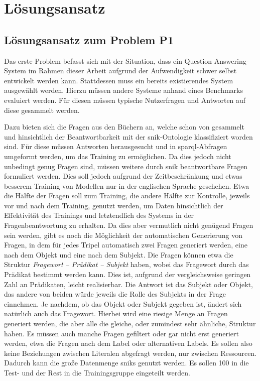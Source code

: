\chapter{Lösungsansatz}\label{ch:approach}

\section{Lösungsansatz zum Problem P1}

Das erste Problem befasst sich mit der Situation, dass ein Question Answering-System im Rahmen dieser Arbeit aufgrund der Aufwendigkeit schwer selbst entwickelt werden kann.
Stattdessen muss ein bereits existierendes System ausgewählt werden.
Hierzu müssen andere Systeme anhand eines Benchmarks evaluiert werden.
Für diesen müssen typische Nutzerfragen und Antworten auf diese gesammelt werden.

Dazu bieten sich die Fragen aus den Büchern an, welche schon von \citet{arneba} gesammelt und hinsichtlich der Beantwortbarkeit mit der \ac{snik}-Ontologie klassifiziert worden sind.
Für diese müssen Antworten herausgesucht und in \ac{sparql}-Abfragen umgeformt werden, um das Training zu ermöglichen.
Da dies jedoch nicht unbedingt genug Fragen sind, müssen weitere durch \ac{snik} beantwortbare Fragen formuliert werden.
Dies soll jedoch aufgrund der Zeitbeschränkung und etwas besserem Training von Modellen nur in der englischen Sprache geschehen.
Etwa die Hälfte der Fragen soll zum Training, die andere Hälfte zur Kontrolle, jeweils vor und nach dem Training, genutzt werden,
um Daten hinsichtlich der Effektivität des Trainings und letztendlich des Systems in der Fragenbeantwortung zu erhalten.
Da dies aber vermutlich nicht genügend Fragen sein werden, gibt es noch die Möglichkeit der automatischen Generierung von Fragen, in dem für jedes Tripel automatisch zwei Fragen generiert werden,
eine nach dem Objekt und eine nach dem Subjekt.
Die Fragen können etwa die Struktur \emph{Fragewort -- Prädikat -- Subjekt} haben, wobei das Fragewort durch das Prädikat bestimmt werden kann.
Dies ist, aufgrund der vergleichsweise geringen Zahl an Prädikaten, leicht realisierbar.
Die Antwort ist das Subjekt oder Objekt, das andere von beiden würde jeweils die Rolle des Subjekts in der Frage einnehmen.
Je nachdem, ob das Objekt oder Subjekt gegeben ist, ändert sich natürlich auch das Fragewort.
Hierbei wird eine riesige Menge an Fragen generiert werden, die aber alle die gleiche, oder zumindest sehr ähnliche, Struktur haben.
Es müssen auch manche Fragen gefiltert oder gar nicht erst generiert werden, etwa die Fragen nach dem Label oder alternativen Labels.
Es sollen also keine Beziehungen zwischen Literalen abgefragt werden, nur zwischen Ressourcen.
Dadurch kann die große Datenmenge \ac{snik}s genutzt werden.
Es sollen 100 in die Test- und der Rest in die Trainingsgruppe eingeteilt werden.

